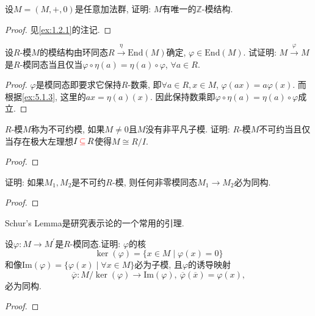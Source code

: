 \begin{problem}\label{ex:5.1.4}
    设$M = (M, +, 0)$是任意加法群, 证明: $M$有唯一的$\mathbb{Z}$-模结构.
\end{problem}

\begin{proof}
    见\ref{ex:1.2.1}的注记.
\end{proof}

\begin{problem}
    设$R$-模$M$的模结构由环同态$R \xrightarrow{\eta} \mathrm{End}(M)$确定, $\varphi \in \mathrm{End}(M)$. 试证明: $M \xrightarrow{\varphi} M$是$R$-模同态当且仅当$\varphi \circ \eta(a) = \eta(a) \circ \varphi$, $\forall a \in R$.
\end{problem}

\begin{proof}
    $\varphi$是模同态即要求它保持$R$-数乘, 即$\forall a \in R, x \in M$, $\varphi(ax) = a\varphi(x)$. 而根据\ref{ex:5.1.3}, 这里的$ax = \eta(a)(x)$. 因此保持数乘即$\varphi \circ \eta(a) = \eta(a) \circ \varphi$成立.
\end{proof}

\begin{problem}
    $R$-模$M$称为不可约模, 如果$M \neq 0$且$M$没有非平凡子模. 证明: $R$-模$M$不可约当且仅当存在极大左理想$I \,\textcolor{red}{\subseteq}\, R$使得$M \cong R/I$.
\end{problem}

\begin{proof}
    
\end{proof}

\begin{problem}[舒尔(Schur)引理]
    证明: 如果$M_1, M_2$是不可约$R$-模, 则任何非零模同态$M_1 \to M_2$必为同构.
\end{problem}

\begin{proof}
    
\end{proof}

\begin{remark}
    Schur's Lemma是研究表示论的一个常用的引理.
\end{remark}

\begin{problem}[同态基本定理]
    设$\varphi:M\to M^{\prime}$是$R$-模同态.证明: $\varphi$的核
    \[
        \ker(\varphi) = \{x \in M \mid \varphi(x) = 0\}
    \]
    和像$\mathrm{Im}(\varphi) = \{\varphi(x) \mid \forall x \in M\}$必为子模, 且$\varphi$的诱导映射
    \[
        \overline{\varphi}:M/\ker(\varphi) \to \mathrm{Im}(\varphi),\: \overline{\varphi}(\overline{x}) = \varphi(x),
    \]
    必为同构.
\end{problem}

\begin{proof}
    
\end{proof}